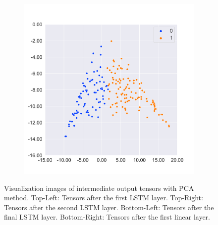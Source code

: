 \begin{figure}[htbp]
\begin{subfigure}
    \end{subfigure}
    \begin{subfigure}
        \centering
        \includegraphics[width=0.45\linewidth]{../images/sst2_feature_map4_pca.png}
    \end{subfigure}
    \caption{Visualization images of intermediate output tensors with PCA method. Top-Left: Tensors after the first LSTM layer. Top-Right: Tensors after the second LSTM layer. Bottom-Left: Tensors after the final LSTM layer. Bottom-Right: Tensors after the first linear layer.}
    \label{fig:sst_pca}
\end{figure}

